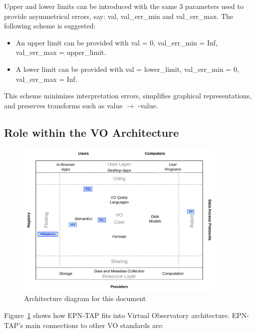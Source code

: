 \documentclass[11pt,a4paper]{ivoa}
\begin{document}
\begin{itemize}
Upper and lower limits can be introduced with the same 3 parameters
used to provide asymmetrical errors, say: val, val\_err\_min and
val\_err\_max. The following scheme is suggested:

\begin{itemize}
\item An upper limit can be provided with val = 0, val\_err\_min = Inf,
val\_err\_max = upper\_limit.

\item A lower limit can be provided with val = lower\_limit,
val\_err\_min = 0, val\_err\_max = Inf.
\end{itemize}

This scheme minimizes interpretation errors, simplifies graphical
representations, and preserves transforms such as value $\to$ -value.

\end{itemize}



\subsection{Role within the VO Architecture}

\begin{figure}[thb]
\centering

\includegraphics[width=0.9\textwidth]{role_diagram.pdf}
\caption{Architecture diagram for this document}
\label{fig:archdiag}
\end{figure}

Figure~\ref{fig:archdiag} shows how EPN-TAP fits into Virtual
Observatory architecture.  EPN-TAP's main connections to other VO
standards are:
\end{document}
